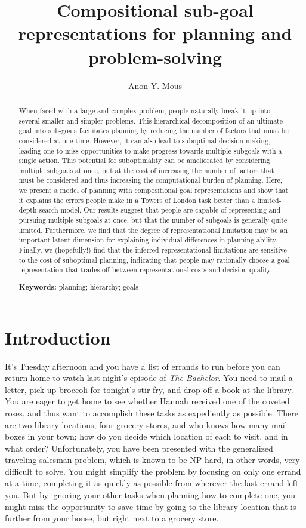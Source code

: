 \documentclass[10pt,letterpaper]{article}
\title{Compositional sub-goal representations for planning and problem-solving}
\author{Anon Y. Mous}
\begin{document}
\maketitle


\begin{abstract}
When faced with a large and complex problem, people naturally break it up into several smaller and simpler problems. This hierarchical decomposition of an ultimate goal into sub-goals facilitates planning by reducing the number of factors that must be considered at one time. However, it can also lead to suboptimal decision making, leading one to miss opportunities to make progress towards multiple subgoals with a single action. This potential for suboptimality can be ameliorated by considering multiple subgoals at once, but at the cost of increasing the number of factors that must be considered and thus increasing the computational burden of planning. Here, we present a model of planning with compositional goal representations and show that it explains the errors people make in a Towers of London task better than a limited-depth search model. Our results suggest that people are capable of representing and pursuing multiple subgoals at once, but that the number of subgoals is generally quite limited. Furthermore, we find that the degree of representational limitation may be an important latent dimension for explaining individual differences in planning ability. Finally, we (hopefully!) find that the inferred representational limitations are sensitive to the cost of suboptimal planning, indicating that people may rationally choose a goal representation that trades off between representational costs and decision quality.

\textbf{Keywords:} 
planning; hierarchy; goals
\end{abstract}


\section{Introduction}

It's Tuesday afternoon and you have a list of errands to run before you can return home to watch last night's episode of \textit{The Bachelor}. You need to mail a letter, pick up broccoli for tonight's stir fry, and drop off a book at the library. You are eager to get home to see whether Hannah received one of the coveted roses, and thus want to accomplish these tasks as expediently as possible. There are two library locations, four grocery stores, and who knows how many mail boxes in your town; how do you decide which location of each to visit, and in what order? Unfortunately, you have been presented with the generalized traveling salesman problem, which is known to be NP-hard, in other words, very difficult to solve. You might simplify the problem by focusing on only one errand at a time, completing it as quickly as possible from wherever the last errand left you. But by ignoring your other tasks when planning how to complete one, you might miss the opportunity to save time by going to the library location that is further from your house, but right next to a grocery store.
\end{document}
